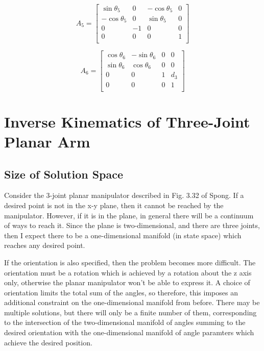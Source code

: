 \documentclass{article}
\begin{document}
\[ A_5 = \left[
	\begin{matrix}
		\sin \theta_5 & 0 & - \cos \theta_5 & 0 \\
		- \cos \theta_5 & 0 & \sin \theta_5 & 0 \\
		0 & -1 & 0 & 0 \\
		0 & 0 & 0 & 1 \\
	\end{matrix} \right] \]

\[ A_6 = \left[
	\begin{matrix}
		\cos \theta_6 & - \sin \theta_6 & 0 & 0 \\
		\sin \theta_6 & \cos \theta_6 & 0 & 0 \\
		0 & 0 & 1 & d_3 \\
		0 & 0 & 0 & 1 \\	
	\end{matrix} \right] \]

\section{Inverse Kinematics of Three-Joint Planar Arm}

\subsection{Size of Solution Space}

Consider the 3-joint planar manipulator described in Fig. 3.32 of Spong.
If a desired point is not in the x-y plane, then it cannot be 
	reached by the manipulator.
However, if it is in the plane, in general there will be a continuum
	of ways to reach it.
Since the plane is two-dimensional, and there are three joints, then
	I expect there to be a one-dimensional manifold (in state space)
	which reaches any desired point.

If the orientation is also specified, then the problem becomes more difficult.
The orientation must be a rotation which is achieved by a rotation about the
	z axis only, otherwise the planar manipulator won't be able to express it.
A choice of orientation limits the total sum of the angles, so therefore,
	this imposes an additional constraint on the one-dimensional manifold
	from before.
There may be multiple solutions, but there will only be a finite number
	of them, corresponding to the intersection of the two-dimensional
	manifold of angles summing to the desired orientation with the one-dimensional
	manifold of angle paramters which achieve the desired position.
\end{document}
